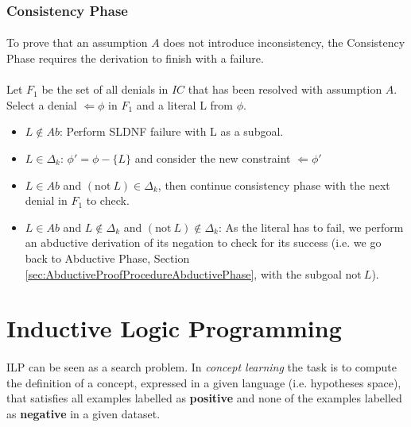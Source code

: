 \documentclass{article}
\theoremstyle{plain}
\theoremstyle{definition}
\begin{document}
\begin{multicols}{2}
\subsubsection{Consistency Phase}\label{sec:AbductiveProofProcedureConsistencyPhase}

\paragraph{} To prove that an assumption $A$ does not introduce inconsistency, the Consistency Phase requires the derivation to finish with a failure.

\paragraph{} Let $F_1$ be the set of all denials in $IC$ that has been resolved with assumption $A$. Select a denial $\Leftarrow \phi$ in $F_1$ and a literal L from $\phi$.

\begin{itemize}
\item $L \not\in Ab$: Perform SLDNF failure with L as a subgoal.
\item $L \in \Delta_k$: $\phi' = \phi - \{L\}$ and consider the new constraint $\Leftarrow \phi'$\
\item $L \in Ab$ and $(\text{not}\ L) \in \Delta_k$, then continue consistency phase with the next denial in $F_1$ to check.
\item $L \in Ab$ and $L \not\in \Delta_k$ and $(\text{not}\ L) \not\in \Delta_k$: As the literal has to fail, we perform an abductive derivation of its negation to check for its success (i.e. we go back to Abductive Phase, Section \ref{sec:AbductiveProofProcedureAbductivePhase}, with the subgoal $\text{not}\ L$). 
\end{itemize}

\section{Inductive Logic Programming}

\paragraph{} ILP can be seen as a search problem. In \textit{concept learning} the task is to compute the definition of a concept, expressed in a given language (i.e. hypotheses space), that satisfies all examples labelled as \textbf{positive} and none of the examples labelled as \textbf{negative} in a given dataset.


\end{multicols}
\end{document}
